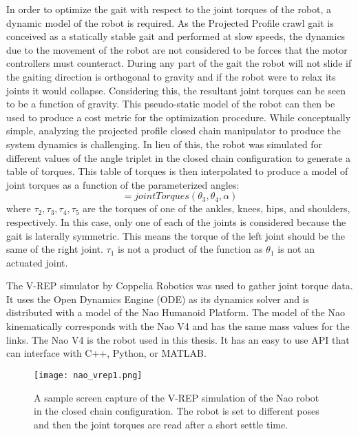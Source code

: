 In order to optimize the gait with respect to the joint torques of the robot, a dynamic model of the robot is required.
As the Projected Profile crawl gait is conceived as a statically stable gait and performed at slow speeds,
the dynamics due to the movement of the robot are not considered to be forces that the 
motor controllers must counteract. 
During any part of the gait the robot will not slide if the gaiting direction is orthogonal to gravity and
if the robot were to relax its joints it would collapse.
Considering this, the resultant joint torques can be seen to be a function of gravity. 
This pseudo-static model of the robot can then be used to produce a cost metric for the optimization procedure.
While conceptually simple, analyzing the projected profile closed chain manipulator to produce the 
system dynamics is challenging.
In lieu of this, the robot was simulated for different values of the angle triplet in the closed chain 
configuration to generate a table of torques. This table of torques is then interpolated to produce
a model of joint torques as a function of the parameterized angles:
\begin{equation}
	[\tau_2, \tau_2, \tau_4, \tau_5] = jointTorques(\theta_3, \theta_4, \alpha)
\end{equation}
where $\tau_2, \tau_3, \tau_4, \tau_5$ are the torques of one of the ankles, knees, hips, and shoulders, respectively.
In this case, only one of each of the joints is considered because the gait is laterally symmetric. This means
the torque of the left joint should be the same of the right joint.
$\tau_1$ is not a product of the function as $\theta_1$ is not an actuated joint.

The V-REP simulator by Coppelia Robotics was used to gather joint torque data. It uses the Open Dynamics Engine (ODE)
as its dynamics solver and is distributed with a model of the Nao Humanoid Platform. The model of the Nao
kinematically corresponds with the Nao V4 and has the same mass values for the links. 
The Nao V4 is the robot used in this thesis.
It has an easy to use API that can interface with C++, Python, or MATLAB.

\begin{figure}
	\texttt{[image: nao\_vrep1.png]}
  	\caption{ A sample screen capture of the V-REP simulation of the Nao robot in the closed
  				chain configuration. The robot is set to different poses and then the joint torques
  				are read after a short settle time.
  			}
  	\label{fig:nao_vrep1}
\end{figure}

